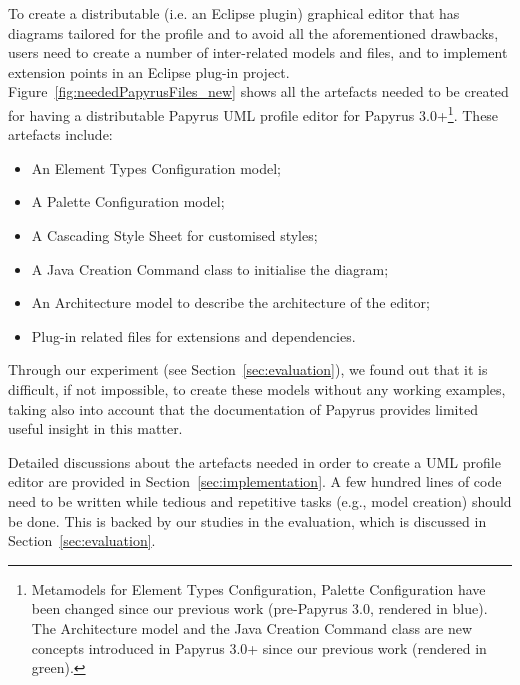 To create a distributable (i.e. an Eclipse plugin) graphical editor that has diagrams tailored for the profile and to avoid all the aforementioned drawbacks, users need to create a number of inter-related models and files, and to implement extension points in an Eclipse plug-in project. 
Figure~\ref{fig:neededPapyrusFiles_new} shows all the artefacts needed to be created for having a distributable Papyrus UML profile editor for Papyrus 3.0+\footnote{Metamodels for Element Types Configuration, Palette Configuration have been changed since our previous work (pre-Papyrus 3.0, rendered in blue). The Architecture model and the Java Creation Command class are new concepts introduced in Papyrus 3.0+ since our previous work (rendered in green).}.
These artefacts include:
\begin{itemize}
	\item An Element Types Configuration model;
	\item A Palette Configuration model;
	\item A Cascading Style Sheet for customised styles;
	\item A Java Creation Command class to initialise the diagram;
	\item An Architecture model to describe the architecture of the editor;
	\item Plug-in related files for extensions and dependencies.
\end{itemize}

Through our experiment (see Section~\ref{sec:evaluation}), we found out that it is difficult, if not impossible, to create these models without any working examples, taking also into account that the documentation of Papyrus provides limited useful insight in this matter.

Detailed discussions about the artefacts needed in order to create a UML profile editor are provided in Section~\ref{sec:implementation}.
A few hundred lines of code need to be written while tedious and repetitive tasks (e.g., model creation) should be done. 
This is backed by our studies in the evaluation, which is discussed in Section~\ref{sec:evaluation}.

